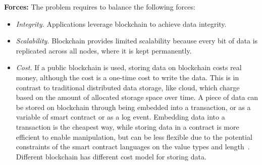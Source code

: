 \vspace{0.5em}\noindent \textbf{Forces:} The problem requires to balance the following forces:
\begin{itemize}
  \item \textit{Integrity.} Applications leverage blockchain to achieve data integrity.
  \item \textit{Scalability.} Blockchain provides limited scalability because every bit of data is replicated across all nodes, where it is kept permanently.
  \item \textit{Cost.} If a public blockchain is used, storing data on blockchain costs real money, although the cost is a one-time cost to write the data. This is in contrast to traditional distributed data storage, like cloud, which charge based on the amount of allocated storage space over time. A piece of data can be stored on blockchain through being embedded into a transaction, or as a variable of smart contract or as a log event. Embedding data into a transaction is the cheapest way, while storing data in a contract is more efficient to enable manipulation, but can be less flexible due to the potential constraints of the smart contract languages on the value types and length~\cite{Sherry:ICSA2017}. Different blockchain has different cost model for storing data.
  
  



\end{itemize}
